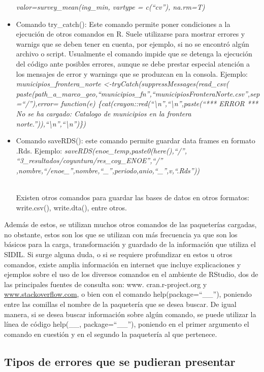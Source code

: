 \documentclass[
]{article}
\begin{document}
\begin{itemize}
  \emph{valor=survey\_mean(ing\_min, vartype = c(``cv''), na.rm=T)}
\item
  Comando try\_catch(): Este comando permite poner condiciones a la ejecución de otros comandos en R. Suele utilizarse para mostrar errores y warnigs que se deben tener en cuenta, por ejemplo, si no se encontró algún archivo o script. Usualmente el comando impide que se detenga la ejecución del código ante posibles errores, aunque se debe prestar especial atención a los mensajes de error y warnings que se produzcan en la consola. Ejemplo:\\
  \emph{municipios\_frontera\_norte \textless-tryCatch(suppressMessages(read\_csv(} \emph{paste(path\_a\_marco\_geo,``municipios\_fn'',``municipiosFronteraNorte.csv'',sep=``/''),error= function(e) \{cat(crayon::red(``\textbackslash n'',``\textbackslash n'',paste(``*** ERROR *** No se ha cargado: Catalogo de municipios en la frontera norte.'')),``\textbackslash n'',``\textbackslash n'')\})}
\item
  Comando saveRDS(): este comando permite guardar data frames en formato .Rds. Ejemplo: \emph{saveRDS(enoe\_temp,paste0(here(),``/'', ``3\_resultados/coyuntura/res\_coy\_ENOE'',``/'' ,nombre,``/enoe\_'',nombre,``\_'',periodo,anio,``\_'',v,``.Rds''))}\\
  \strut \\
  Existen otros comandos para guardar las bases de datos en otros formatos: write.csv(), write.dta(), entre otros.
\end{itemize}

Además de estos, se utilizan muchos otros comandos de las paqueterías cargadas, no obstante, estos son los que se utilizan con más frecuencia ya que son los básicos para la carga, transformación y guardado de la información que utiliza el SIDIL. Si surge alguna duda, o si se requiere profundizar en estos u otros comandos, existe amplia información en internet que incluye explicaciones y ejemplos sobre el uso de los diversos comandos en el ambiente de RStudio, dos de las principales fuentes de consulta son: www. cran.r-project.org y \href{http://www.stackoverflow.com}{www.stackoverflow.com}, o bien con el comando help(package=``\_\_''), poniendo entre las comillas el nombre de la paquetería que se desea buscar. De igual manera, si se desea buscar información sobre algún comando, se puede utilizar la línea de código help(\_\_, package=``\_\_''), poniendo en el primer argumento el comando en cuestión y en el segundo la paquetería al que pertenece.

\hypertarget{tipos-de-errores-que-se-pudieran-presentar}{%
\subsection{Tipos de errores que se pudieran presentar}\label{tipos-de-errores-que-se-pudieran-presentar}}
\end{document}
